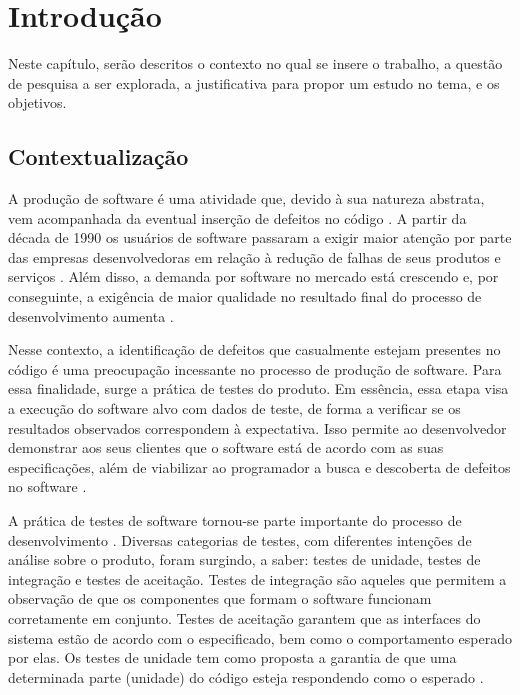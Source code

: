 \chapter[Introdução]{Introdução}

Neste capítulo, serão descritos o contexto no qual se insere o trabalho, a questão de pesquisa a ser explorada, a justificativa para propor um estudo no tema, e os objetivos.

 \section{Contextualização}
  \indent A produção de software é uma atividade que, devido à sua natureza abstrata, vem acompanhada da eventual inserção de defeitos no código \cite{trodo2009}. A partir da década de 1990 os usuários de software passaram a exigir maior atenção por parte das empresas desenvolvedoras em relação à redução de falhas de seus produtos e serviços \cite{sommerville2007}. Além disso, a demanda por software no mercado está crescendo \cite{philipson2004} e, por conseguinte, a exigência de maior qualidade no resultado final do processo de desenvolvimento aumenta \cite{barbosaEtAl2009}.
  \par
  \indent Nesse contexto, a identificação de defeitos que casualmente estejam presentes no código é uma preocupação incessante no processo de produção de software. Para essa finalidade, surge a prática de testes do produto. Em essência, essa etapa visa a execução do software alvo com dados de teste, de forma a verificar se os resultados observados correspondem à expectativa. Isso permite ao desenvolvedor demonstrar aos seus clientes que o software está de acordo com as suas especificações, além de viabilizar ao programador a busca e descoberta de defeitos no software \cite{sommerville2007}.
  \par
  \indent A prática de testes de software tornou-se parte importante do processo de desenvolvimento \cite{barbosaEtAl2009}. Diversas categorias de testes, com diferentes intenções de análise sobre o produto, foram surgindo, a saber: testes de unidade, testes de integração e testes de aceitação. Testes de integração são aqueles que permitem a observação de que os componentes que formam o software funcionam corretamente em conjunto. Testes de aceitação garantem que as interfaces do sistema estão de acordo com o especificado, bem como o comportamento esperado por elas. Os testes de unidade tem como proposta a garantia  de que uma determinada parte (unidade) do código esteja respondendo como o esperado \cite{sommerville2007}.
